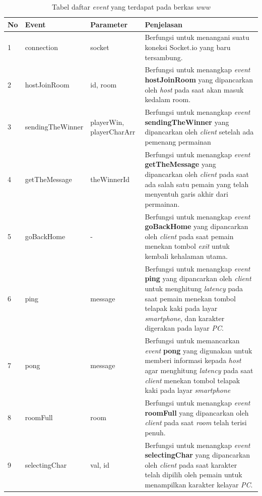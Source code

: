 \begin{enumerate}
\begin{enumerate}
		\begin{table}[H]
			\centering
			\caption{Tabel daftar \textit{event} yang terdapat pada berkas \textit{www}}
			\begin{tabular}{|p{0.35cm}|p{3cm}|p{3cm}|p{7cm}|}
				\hline
				No & Event & Parameter & Penjelasan \\ \hline
				1 & connection & socket & Berfungsi untuk menangani suatu koneksi Socket.io yang baru tersambung. \\ \hline
				2 & hostJoinRoom & id, room & Berfungsi untuk menangkap \textit{event} \textbf{hostJoinRoom} yang dipancarkan oleh \textit{host} pada saat akan masuk kedalam room. \\ \hline
				3 & sendingTheWinner & playerWin, playerCharArr & Berfungsi untuk menangkap \textit{event} \textbf{sendingTheWinner} yang dipancarkan oleh \textit{client} setelah ada pemenang permainan \\ \hline
				4 & getTheMessage & theWinnerId & Berfungsi untuk menangkap \textit{event} \textbf{getTheMessage} yang dipancarkan oleh \textit{client} pada saat ada salah satu pemain yang telah menyentuh garis akhir dari permainan. \\ \hline
				5 & goBackHome & - & Berfungsi untuk menangkap \textit{event} \textbf{goBackHome} yang dipancarkan oleh \textit{client} pada saat pemain menekan tombol \textit{exit} untuk kembali kehalaman utama. \\ \hline
				6 & ping & message & Berfungsi untuk menangkap \textit{event} \textbf{ping} yang dipancarkan oleh \textit{client} untuk menghitung \textit{latency} pada saat pemain menekan tombol telapak kaki pada layar \textit{smartphone}, dan karakter digerakan pada layar \textit{PC}. \\ \hline
				7 & pong & message & Berfungsi untuk memancarkan \textit{event} \textbf{pong} yang digunakan untuk memberi informasi kepada \textit{host} agar menghitung \textit{latency} pada saat \textit{client} menekan tombol telapak kaki pada layar \textit{smartphone} \\ \hline
				8 & roomFull & room & Berfungsi untuk menangkap \textit{event} \textbf{roomFull} yang dipancarkan oleh \textit{client} pada saat \textit{room} telah terisi penuh. \\ \hline
				9 & selectingChar & val, id & Berfungsi untuk menangkap \textit{event} \textbf{selectingChar} yang dipancarkan oleh \textit{client} pada saat karakter telah dipilih oleh pemain untuk menampilkan karakter kelayar \textit{PC}. \\ \hline

\end{tabular}
\end{table}
\end{enumerate}
\end{enumerate}
